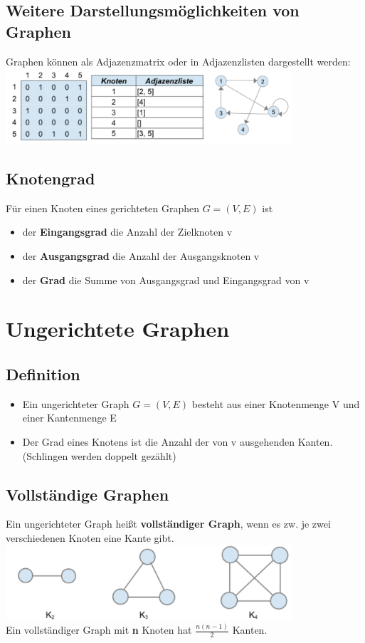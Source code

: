 \documentclass{scrreprt}
\begin{document}
\subsection{Weitere Darstellungsmöglichkeiten von Graphen}
Graphen können als Adjazenzmatrix oder in Adjazenzlisten dargestellt werden:\\
\includegraphics[width=0.8\textwidth]{"graphics/adjazenz"}
\subsection{Knotengrad}
Für einen Knoten eines gerichteten Graphen $G=(V,E)$ ist
\begin{itemize}
    \item der \textbf{Eingangsgrad} die Anzahl der Zielknoten v
    \item der \textbf{Ausgangsgrad} die Anzahl der Ausgangsknoten v
    \item der \textbf{Grad} die Summe von Ausgangsgrad und Eingangsgrad von v
\end{itemize}
\section{Ungerichtete Graphen}
\subsection{Definition}
\begin{itemize}
    \item Ein ungerichteter Graph $G=(V,E)$ besteht aus einer Knotenmenge V und einer Kantenmenge E
    \item Der Grad eines Knotens ist die Anzahl der von v ausgehenden Kanten.
    \\(Schlingen werden doppelt gezählt)
\end{itemize}
\subsection{Vollständige Graphen}
Ein ungerichteter Graph heißt \textbf{vollständiger Graph}, wenn es zw. je zwei verschiedenen Knoten eine Kante gibt.\\
\includegraphics[width=0.8\textwidth]{"graphics/vollst-Graph"}
\\
Ein vollständiger Graph mit \textbf{n} Knoten hat $\frac{n(n-1)}{2}$ Kanten.
\end{document}
